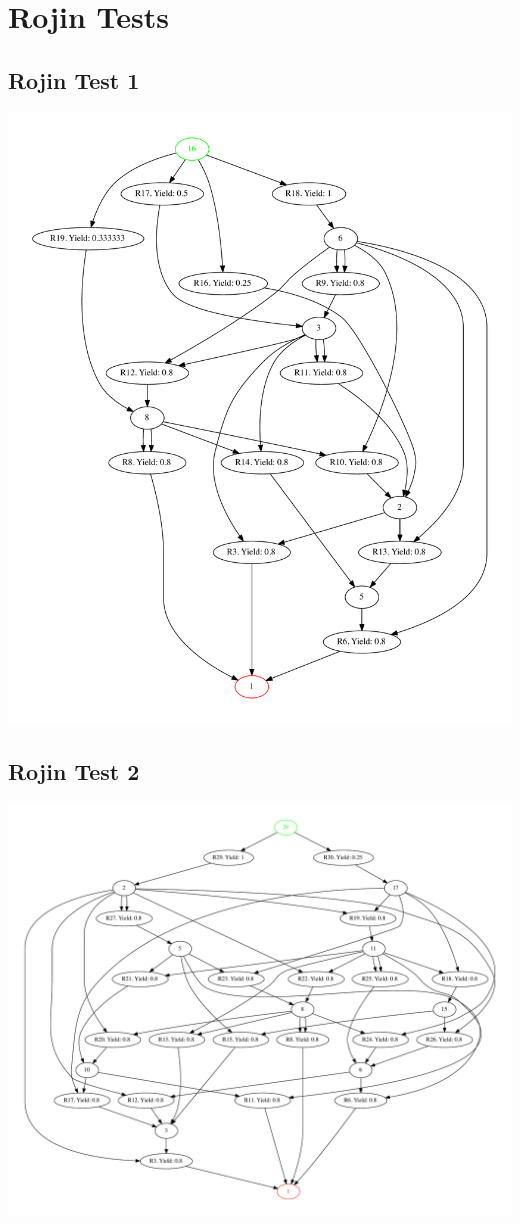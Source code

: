\documentclass[a4paper,10pt,titlepage]{paper}
\begin{document}
\section{Rojin Tests}
\subsection{Rojin Test 1}
\centering
\includegraphics[scale=0.4]{RojinGrafer/Test1.pdf}
\label{Appendix::Rojin1}

\subsection{Rojin Test 2}
\centering
\includegraphics[scale=0.4, angle=90]{RojinGrafer/Test2.pdf}
\label{Appendix::Rojin2}
\end{document}

